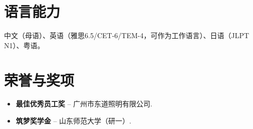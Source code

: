 \documentclass[11pt,a4paper,sans]{moderncv}
\begin{document}

\section{语言能力}
\vspace{1pt}

中文（母语）、英语（雅思6.5/CET-6/TEM-4，可作为工作语言）、日语（JLPT N1）、粤语。


\section{荣誉与奖项}
\vspace{1pt}
\begin{itemize}
\item{\textbf{最佳优秀员工奖} -- 广州市东道照明有限公司.}
\item{\textbf{筑梦奖学金} -- 山东师范大学（研一）.}
\end{itemize}
\end{document}
